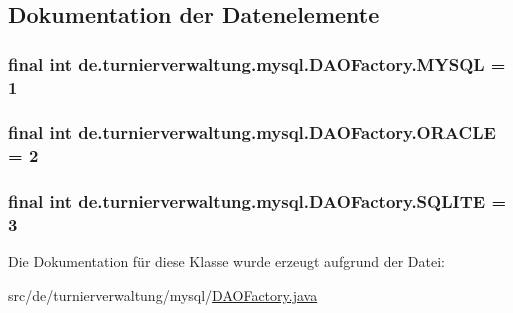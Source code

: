 \subsection{Dokumentation der Datenelemente}
\subsubsection[{\texorpdfstring{M\+Y\+S\+QL}{MYSQL}}]{\setlength{\rightskip}{0pt plus 5cm}final int de.\+turnierverwaltung.\+mysql.\+D\+A\+O\+Factory.\+M\+Y\+S\+QL = 1\hspace{0.3cm}{\ttfamily [static]}}\hypertarget{classde_1_1turnierverwaltung_1_1mysql_1_1_d_a_o_factory_ae4597981317f9a3d96418f7da4e996bd}{}\label{classde_1_1turnierverwaltung_1_1mysql_1_1_d_a_o_factory_ae4597981317f9a3d96418f7da4e996bd}
\subsubsection[{\texorpdfstring{O\+R\+A\+C\+LE}{ORACLE}}]{\setlength{\rightskip}{0pt plus 5cm}final int de.\+turnierverwaltung.\+mysql.\+D\+A\+O\+Factory.\+O\+R\+A\+C\+LE = 2\hspace{0.3cm}{\ttfamily [static]}}\hypertarget{classde_1_1turnierverwaltung_1_1mysql_1_1_d_a_o_factory_a6a61d8f31da173bcf33c3a919506cee5}{}\label{classde_1_1turnierverwaltung_1_1mysql_1_1_d_a_o_factory_a6a61d8f31da173bcf33c3a919506cee5}
\subsubsection[{\texorpdfstring{S\+Q\+L\+I\+TE}{SQLITE}}]{\setlength{\rightskip}{0pt plus 5cm}final int de.\+turnierverwaltung.\+mysql.\+D\+A\+O\+Factory.\+S\+Q\+L\+I\+TE = 3\hspace{0.3cm}{\ttfamily [static]}}\hypertarget{classde_1_1turnierverwaltung_1_1mysql_1_1_d_a_o_factory_aa8c60bceb0b843f803bb35fd73400eec}{}\label{classde_1_1turnierverwaltung_1_1mysql_1_1_d_a_o_factory_aa8c60bceb0b843f803bb35fd73400eec}


Die Dokumentation für diese Klasse wurde erzeugt aufgrund der Datei\+:\begin{DoxyCompactItemize}
\item 
src/de/turnierverwaltung/mysql/\hyperlink{_d_a_o_factory_8java}{D\+A\+O\+Factory.\+java}\end{DoxyCompactItemize}
